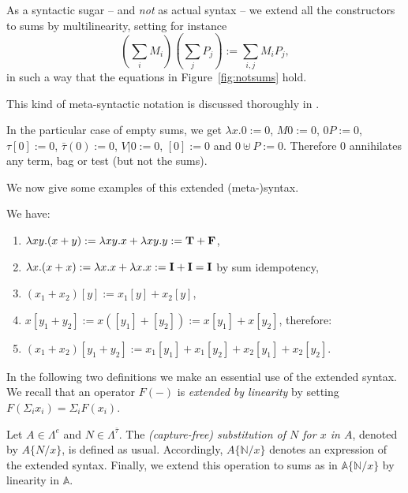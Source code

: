 \documentclass{LMCS}
\newcommand{\lam}{\ensuremath{\lambda}}
\newcommand{\paral}{\vert}
\newcommand{\Set}[1]{\Lambda^{#1}}
\newcommand{\subst}[2]{\{ #2 / #1 \}}	\newcommand{\dg}[2]{\mathrm{deg}_{#1}(#2)} \newcommand{\obsle}{\sqsubseteq_{\mathcal{O}}}
\newcommand{\mcup}{\uplus}
\newcommand{\ass}{:=}
\newcommand{\sA}{\mathbb{A}}
\newcommand{\sN}{\mathbb{N}}
\newcommand{\gt}{\ensuremath{\tau}}
\newcommand{\gto}{\ensuremath{\bar\tau}}
\begin{document}
\begin{conv} As a syntactic sugar -- and \emph{not} as actual syntax --
we extend all the constructors to sums by multilinearity, setting for instance
$$
	(\textstyle\sum_i M_i)(\textstyle\sum_j P_j) := \textstyle\sum_{i,j} M_iP_j,
$$ 
in such a way that the equations in Figure~\ref{fig:notsums} hold.
\end{conv}

This kind of meta-syntactic notation is discussed thoroughly in \cite{EhrhardR08}. 

\begin{rem}
In the  particular case of empty sums, we get
 $\lam x.0 \ass 0$, $M0 \ass 0$, $0P \ass 0$, $\gt[0] \ass 0$, $\gto(0) \ass 0$, $V\paral 0 \ass 0$, $[0] \ass 0$ and $0\mcup P \ass 0$.
 Therefore $0$ annihilates any term, bag or test (but not the sums).
\end{rem}


We now give some examples of this extended (meta-)syntax.

\begin{exa} We have:
\begin{enumerate}[1.] 
\item $\lam xy.(x + y)\ass \lam xy.x + \lam xy.y\ass \bold{T} + \bold{F}$,
\item $\lam x.(x + x)\ass \lam x.x + \lam x.x\ass \bold{I}+ \bold{I} = \bold{I}$ by sum idempotency,
\item $(x_1+x_2)[y] \ass x_1[y] + x_2[y]$,
\item $x[y_1 + y_2] \ass x([y_1] + [y_2])\ass x[y_1] + x[y_2]$, therefore:
\item $(x_1+x_2)[y_1 + y_2]\ass x_1[y_1] + x_1 [y_2] + x_2[y_1] + x_2[y_2]$.
\end{enumerate}
\end{exa}

In the following two definitions we make an essential use of the extended syntax.
We recall that an operator $F(-)$ is \emph{extended by linearity} by setting $F(\Sigma_{i} x_i) = \Sigma_{i} F(x_i)$.

\begin{defi}[Substitution] Let $A\in\Set{e}$ and $N\in\Set{\gto}$.
The \emph{(capture-free) substitution of $N$ for $x$ in $A$}, denoted by $A\subst{x}{N}$, is defined as usual.
Accordingly,  $A\subst{x}{\sN}$ denotes an expression of the extended  syntax.
Finally, we extend this operation to sums as in $\sA\subst{x}{\sN}$ by linearity in $\sA$.
\end{defi}
\end{document}
